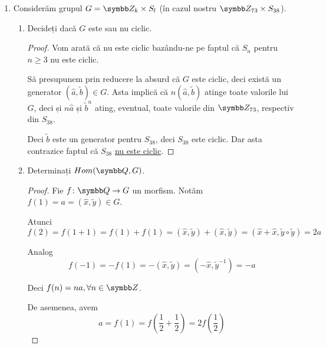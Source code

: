 \begin{enumerate}
\begin{enumerate}
    \begin{proof}
    Pentru \(h\):
    \begin{itemize}
        \item nu este injectivă, dacă luăm \(\frac{-1}{1}\) și \(\frac{1}{1}\) obținem același rezultat, dar parametrii sunt diferiți.
        \item nu este surjectivă, deoarece rezultatul este mereu pozitiv, deci nu acoperă tot \(\rationals\).
    \end{itemize}
    \end{proof}
\end{enumerate}

\item Considerăm grupul \(G = \integersmod{k} \times S_l\) (în cazul nostru \(\integersmod{73} \times S_{38}\)).
\begin{enumerate}
    \item Decideți dacă \(G\) este sau nu ciclic.
    \begin{proof}
    Vom arată că nu este ciclic bazându-ne pe faptul că \(S_n\) pentru \(n \geq 3\) nu este ciclic.

    Să presupunem prin reducere la absurd că \(G\) este ciclic, deci există un generator \((\widehat{a}, \tilde{b}) \in G\). Asta implică că \(n(\widehat{a}, \tilde{b})\) atinge toate valorile lui \(G\), deci și \(n \widehat{a}\) și \(\tilde{b}^n\) ating, eventual, toate valorile din \(\integersmod{73}\), respectiv din \(S_{38}\).

    Deci \(\tilde{b}\) este un generator pentru \(S_{38}\), deci \(S_{38}\) este ciclic. Dar asta contrazice faptul că \(S_{38}\) \href{https://math.stackexchange.com/a/1196364/388180}{nu este ciclic}.
    \end{proof}

    \item Determinați \(\mathop{Hom}(\rationals, G)\).
    \begin{proof}
    Fie \(f \colon \rationals \to G\) un morfism. Notăm \(f(1) = a = (\widehat{x}, \tilde{y}) \in G\).

    Atunci
    \[f(2) = f(1 + 1) = f(1) + f(1) = (\widehat{x}, \tilde{y}) + (\widehat{x}, \tilde{y}) = (\widehat{x} + \widehat{x}, \tilde{y} \circ \tilde{y}) = 2a\]

    Analog
    \[f(-1) = -f(1) = - (\widehat{x}, \tilde{y}) = (-\widehat{x}, \tilde{y}^{-1}) = -a\]

    Deci \(f(n) = n a, \forall n \in \integers\).

    De asemenea, avem
    \[a = f(1) = f\left(\frac{1}{2} + \frac{1}{2}\right) = 2 f\left(\frac{1}{2}\right)\]


\end{proof}
\end{enumerate}
\end{enumerate}
